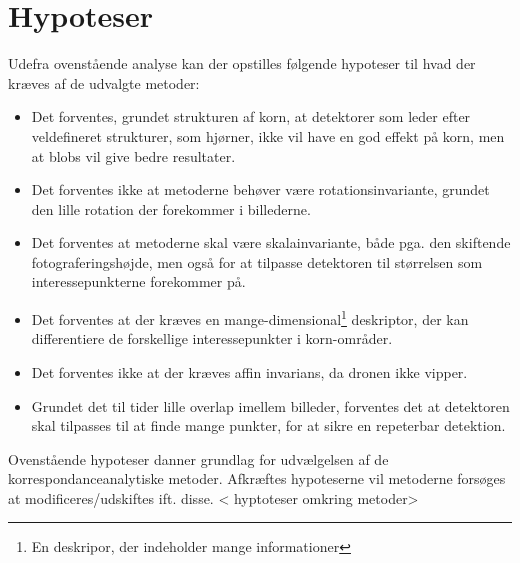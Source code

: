 \section{Hypoteser}
Udefra ovenstående analyse kan der opstilles følgende hypoteser til hvad der kræves af de udvalgte metoder:
\begin{itemize}
\item{ Det forventes, grundet strukturen af korn, at detektorer som leder efter veldefineret strukturer, som hjørner, ikke vil have en god effekt på korn, men at blobs vil give bedre resultater.}
\item{ Det forventes ikke at metoderne behøver være rotationsinvariante, grundet den lille rotation der forekommer i billederne. }
\item{Det forventes at metoderne skal være skalainvariante, både pga. den skiftende fotograferingshøjde, men også for at tilpasse detektoren til størrelsen som interessepunkterne forekommer på.}
\item{Det forventes at der kræves en mange-dimensional\footnote{En deskripor, der indeholder mange informationer} deskriptor, der kan differentiere de forskellige interessepunkter i korn-områder.}
\item{ Det forventes ikke at der kræves affin invarians, da dronen ikke vipper. }
\item{Grundet det til tider lille overlap imellem billeder, forventes det at detektoren skal tilpasses til at finde mange punkter, for at sikre en repeterbar detektion.}
\end{itemize}
Ovenstående hypoteser danner grundlag for udvælgelsen af de korrespondanceanalytiske metoder. Afkræftes hypoteserne vil metoderne forsøges at modificeres/udskiftes ift. disse.
< hyptoteser omkring metoder>